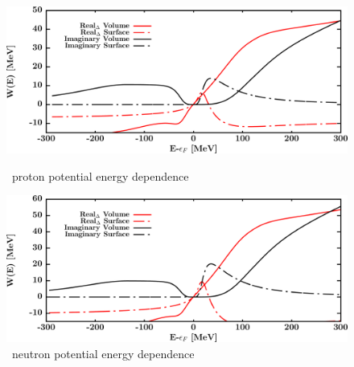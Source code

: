 \begin{figure}[hbtp]
    \centering
    \begin{minipage}{0.42\textwidth}
        \centering
        \includegraphics[width=\textwidth]{figures/o18_protonPotentials.png}
        \caption*{\footnotesize\oEight\ proton potential energy dependence}
        \label{DOMFitData_o18_proton_potentialComponent_energy}
    \end{minipage}\hspace{6pt}
    \begin{minipage}{0.42\textwidth}
        \centering
        \includegraphics[width=\textwidth]{figures/o18_neutronPotentials.png}
        \caption*{\footnotesize\oEight\ neutron potential energy dependence}
        \label{DOMFitData_o18_neutron_potentialComponent_energy}
    \end{minipage}
\end{figure}
